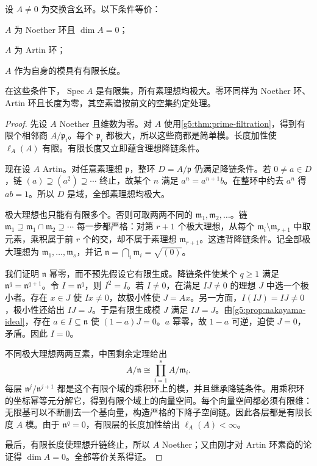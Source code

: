 \begin{theorem}
\label{g5:thm:artinian-zero-dimension}
	设 \(A\ne0\) 为交换含幺环。以下条件等价：
	\begin{equivalences}
		\item \(A\) 为 Noether 环且 \(\dim A=0\)；
		\item \(A\) 为 Artin 环；
		\item \(A\) 作为自身的模具有有限长度。
	\end{equivalences}
	在这些条件下，\(\operatorname{Spec}A\) 是有限集，所有素理想均极大。零环同样为 Noether 环、Artin 环且长度为零，其空素谱按前文的空集约定处理。
\end{theorem}
\begin{proof}
	先设 \(A\) Noether 且维数为零。对 \(A\) 使用\cref{g5:thm:prime-filtration}，得到有限个相邻商 \(A/\mathfrak p_i\)。每个 \(\mathfrak p_i\) 都极大，所以这些商都是简单模。长度加性使 \(\ell_A(A)\) 有限。有限长度又立即蕴含理想降链条件。

	现在设 \(A\) Artin。对任意素理想 \(\mathfrak p\)，整环 \(D=A/\mathfrak p\) 仍满足降链条件。若 \(0\ne a\in D\)，链 \((a)\supseteq(a^2)\supseteq\cdots\) 终止，故某个 \(n\) 满足 \(a^n=a^{n+1}b\)。在整环中约去 \(a^n\) 得 \(ab=1\)。所以 \(D\) 是域，全部素理想均极大。

	极大理想也只能有有限多个。否则可取两两不同的 \(\mathfrak m_1,\mathfrak m_2,\ldots\)。链
	\(\mathfrak m_1\supseteq\mathfrak m_1\cap\mathfrak m_2\supseteq\cdots\)
	每一步都严格：对第 \(r+1\) 个极大理想，从每个 \(\mathfrak m_i\setminus\mathfrak m_{r+1}\) 中取元素，乘积属于前 \(r\) 个的交，却不属于素理想 \(\mathfrak m_{r+1}\)。这违背降链条件。记全部极大理想为 \(\mathfrak m_1,\ldots,\mathfrak m_s\)，并记
	\(\mathfrak n=\bigcap_i\mathfrak m_i=\sqrt{(0)}\)。

	我们证明 \(\mathfrak n\) 幂零，而不预先假设它有限生成。降链条件使某个 \(q\geq1\) 满足 \(\mathfrak n^q=\mathfrak n^{q+1}\)。令 \(I=\mathfrak n^q\)，则 \(I^2=I\)。若 \(I\ne0\)，在满足 \(IJ\ne0\) 的理想 \(J\) 中选一个极小者。存在 \(x\in J\) 使 \(Ix\ne0\)，故极小性使 \(J=Ax\)。另一方面，\(I(IJ)=IJ\ne0\)，极小性还给出 \(IJ=J\)。于是有限生成模 \(J\) 满足 \(IJ=J\)。由\cref{g5:prop:nakayama-ideal}，存在 \(a\in I\subseteq\mathfrak n\) 使 \((1-a)J=0\)。\(a\) 幂零，故 \(1-a\) 可逆，迫使 \(J=0\)，矛盾。因此 \(I=0\)。

	不同极大理想两两互素，中国剩余定理给出
	\[
		A/\mathfrak n\cong\prod_{i=1}^s A/\mathfrak m_i.
	\]
	每层 \(\mathfrak n^j/\mathfrak n^{j+1}\) 都是这个有限个域的乘积环上的模，并且继承降链条件。用乘积环的坐标幂等元分解它，得到有限个域上的向量空间。每个向量空间都必须有限维：无限基可以不断删去一个基向量，构造严格的下降子空间链。因此各层都是有限长度 \(A\) 模。由于 \(\mathfrak n^q=0\)，有限层的长度加性给出 \(\ell_A(A)<\infty\)。

	最后，有限长度使理想升链终止，所以 \(A\) Noether；又由刚才对 Artin 环素商的论证得 \(\dim A=0\)。全部等价关系得证。
\end{proof}

